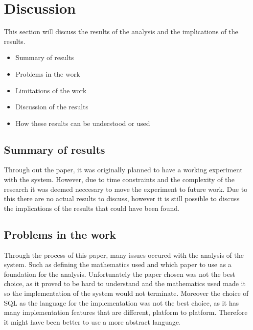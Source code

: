 \section{Discussion}\label{sec:discussion}
This section will discuss the results of the analysis and the implications of the results.

\begin{itemize}
    \item Summary of results
    \item Problems in the work
    \item Limitations of the work
    \item Discussion of the results
    \item How these results can be understood or used
\end{itemize}


\subsection{Summary of results}
Through out the paper, it was originally planned to have a working experiment with the system. However, due to time constraints and the complexity of the research it was deemed neccesary to move the experiment to future work.
Due to this there are no actual results to discuss, however it is still possible to discuss the implications of the results that could have been found.


\subsection{Problems in the work}
Through the process of this paper, many issues occured with the analysis of the system. Such as defining the mathematics used and which paper to use as a foundation for the analysis. Unfortunately the paper chosen was not the best choice, as it proved to be hard to understand and the mathematics used made it so the implementation of the system would not terminate.
Moreover the choice of SQL as the language for the implementation was not the best choice, as it has many implementation features that are different, platform to platform. Therefore it might have been better to use a more abstract language.